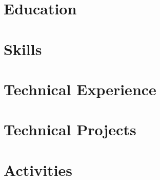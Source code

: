 \documentclass[letter,10pt]{article}
\begin{document}


\section{Education}


\section{Skills}


\section{Technical Experience}


\section{Technical Projects}




\section{Activities}

\end{document}
